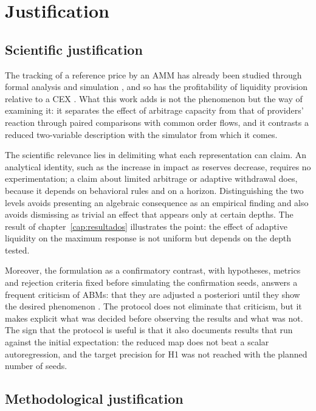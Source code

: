\chapter{Justification}
\label{cap:justificacion}

\section{Scientific justification}

The tracking of a reference price by an AMM has already been studied through formal analysis and simulation \cite{angeris2020uniswap}, and so has the profitability of liquidity provision relative to a CEX \cite{campbell2025optimal,milionis2022lvr}. What this work adds is not the phenomenon but the way of examining it: it separates the effect of arbitrage capacity from that of providers' reaction through paired comparisons with common order flows, and it contrasts a reduced two-variable description with the simulator from which it comes.

The scientific relevance lies in delimiting what each representation can claim. An analytical identity, such as the increase in impact as reserves decrease, requires no experimentation; a claim about limited arbitrage or adaptive withdrawal does, because it depends on behavioral rules and on a horizon. Distinguishing the two levels avoids presenting an algebraic consequence as an empirical finding and also avoids dismissing as trivial an effect that appears only at certain depths. The result of chapter~\ref{cap:resultados} illustrates the point: the effect of adaptive liquidity on the maximum response is not uniform but depends on the depth tested.

Moreover, the formulation as a confirmatory contrast, with hypotheses, metrics and rejection criteria fixed before simulating the confirmation seeds, answers a frequent criticism of ABMs: that they are adjusted a posteriori until they show the desired phenomenon \cite{fagiolo2007critical}. The protocol does not eliminate that criticism, but it makes explicit what was decided before observing the results and what was not. The sign that the protocol is useful is that it also documents results that run against the initial expectation: the reduced map does not beat a scalar autoregression, and the target precision for H1 was not reached with the planned number of seeds.

\section{Methodological justification}

